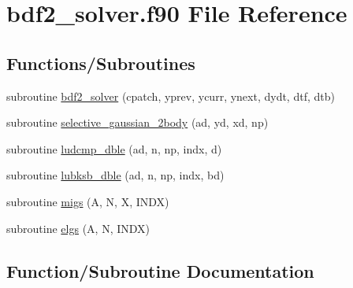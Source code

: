 \hypertarget{bdf2__solver_8f90}{}\section{bdf2\+\_\+solver.\+f90 File Reference}
\label{bdf2__solver_8f90}
\subsection*{Functions/\+Subroutines}
\begin{DoxyCompactItemize}
\item 
subroutine \hyperlink{bdf2__solver_8f90_a341c7d28b12d70f7ad3cbf4b4919f510}{bdf2\+\_\+solver} (cpatch, yprev, ycurr, ynext, dydt, dtf, dtb)
\item 
subroutine \hyperlink{bdf2__solver_8f90_a8dbb8aa5a5523ba3d3eab9c0a85cd089}{selective\+\_\+gaussian\+\_\+2body} (ad, yd, xd, np)
\item 
subroutine \hyperlink{bdf2__solver_8f90_a552f7b3d1a9f5be9c86c45d03135d4b3}{ludcmp\+\_\+dble} (ad, n, np, indx, d)
\item 
subroutine \hyperlink{bdf2__solver_8f90_a39e26f963dd59a961a595767eba16dc4}{lubksb\+\_\+dble} (ad, n, np, indx, bd)
\item 
subroutine \hyperlink{bdf2__solver_8f90_a1d52c0b6e396cbbca4ef5cb6600a36bc}{migs} (A, N, X, I\+N\+DX)
\item 
subroutine \hyperlink{bdf2__solver_8f90_a20b2b6c5902d735ebf45af8197ca2172}{elgs} (A, N, I\+N\+DX)
\end{DoxyCompactItemize}


\subsection{Function/\+Subroutine Documentation}
\mbox{\label{bdf2__solver_8f90_a341c7d28b12d70f7ad3cbf4b4919f510}} 
